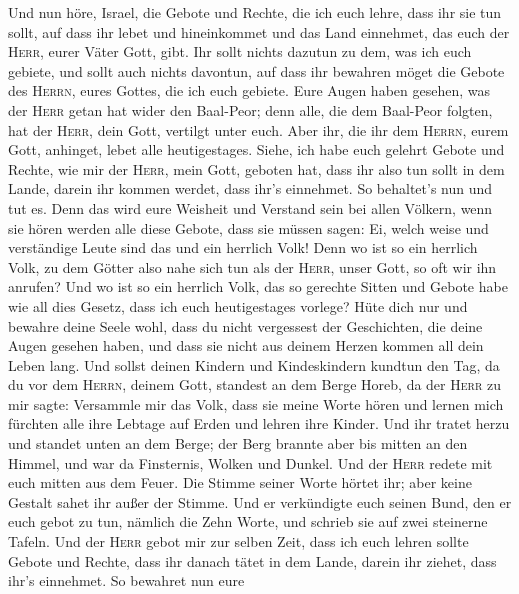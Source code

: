 Und nun höre, Israel, die Gebote und Rechte, die ich euch
lehre, dass ihr sie tun sollt, auf dass ihr lebet und hineinkommet und
das Land einnehmet, das euch der \textsc{Herr}, eurer Väter Gott, gibt.
 Ihr sollt nichts dazutun zu dem, was ich euch gebiete,
und sollt auch nichts davontun, auf dass ihr bewahren möget die Gebote
des \textsc{Herrn}, eures Gottes, die ich euch gebiete. 
Eure Augen haben gesehen, was der \textsc{Herr} getan hat wider den
Baal-Peor; denn alle, die dem Baal-Peor folgten, hat der \textsc{Herr},
dein Gott, vertilgt unter euch.  Aber ihr, die ihr dem
\textsc{Herrn}, eurem Gott, anhinget, lebet alle heutigestages.
 Siehe, ich habe euch gelehrt Gebote und Rechte, wie mir
der \textsc{Herr}, mein Gott, geboten hat, dass ihr also tun sollt in
dem Lande, darein ihr kommen werdet, dass ihr's einnehmet.
 So behaltet's nun und tut es. Denn das wird eure Weisheit
und Verstand sein bei allen Völkern, wenn sie hören werden alle diese
Gebote, dass sie müssen sagen: Ei, welch weise und verständige Leute
sind das und ein herrlich Volk!  Denn wo ist so ein
herrlich Volk, zu dem Götter also nahe sich tun als der \textsc{Herr},
unser Gott, so oft wir ihn anrufen?  Und wo ist so ein
herrlich Volk, das so gerechte Sitten und Gebote habe wie all dies
Gesetz, dass ich euch heutigestages vorlege?  Hüte dich
nur und bewahre deine Seele wohl, dass du nicht vergessest der
Geschichten, die deine Augen gesehen haben, und dass sie nicht aus
deinem Herzen kommen all dein Leben lang. Und sollst deinen Kindern und
Kindeskindern kundtun  den Tag, da du vor dem
\textsc{Herrn}, deinem Gott, standest an dem Berge Horeb, da der
\textsc{Herr} zu mir sagte: Versammle mir das Volk, dass sie meine Worte
hören und lernen mich fürchten alle ihre Lebtage auf Erden und lehren
ihre Kinder.  Und ihr tratet herzu und standet unten an
dem Berge; der Berg brannte aber bis mitten an den Himmel, und war da
Finsternis, Wolken und Dunkel.  Und der \textsc{Herr}
redete mit euch mitten aus dem Feuer. Die Stimme seiner Worte hörtet
ihr; aber keine Gestalt sahet ihr außer der Stimme.  Und
er verkündigte euch seinen Bund, den er euch gebot zu tun, nämlich die
Zehn Worte, und schrieb sie auf zwei steinerne Tafeln. 
Und der \textsc{Herr} gebot mir zur selben Zeit, dass ich euch lehren
sollte Gebote und Rechte, dass ihr danach tätet in dem Lande, darein ihr
ziehet, dass ihr's einnehmet.  So bewahret nun eure
